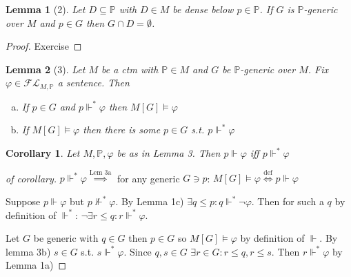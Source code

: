 \documentclass{scrartcl}
\theoremstyle{definition}
\theoremstyle{plain}
\newtheorem*{lemma*}{Lemma}
\newtheorem*{corollary*}{Corollary}
\theoremstyle{remark}
\begin{document}
	\begin{lemma*}[2]
		Let $D \subseteq \mathbb{P}$ with $D \in M$ be dense below
		$p \in \mathbb{P}$. If $G$ is $\mathbb{P}$-generic over $M$
		and $p \in G$ then $G \cap D = \emptyset$.
	\end{lemma*}

	\begin{proof}
		Exercise
	\end{proof}

	\begin{lemma*}[3]
		Let $M$ be a ctm with $\mathbb{P} \in M$ and $G$
		be $\mathbb{P}$-generic over $M$. Fix $\varphi \in \mathcal{FL}_{M, \mathbb{P}}$ a sentence. Then

		\begin{enumerate}[(a)]
			\item If $p \in G$ and $p \Vdash^* \varphi $ then
			$M[G] \vDash \varphi$

			\item If $M[G] \vDash \varphi$ then there is some
			$p \in G$ s.t. $p \Vdash^* \varphi$
		\end{enumerate}
	\end{lemma*}

	\begin{corollary*}
		Let $M, \mathbb{P}, \varphi $ be as in Lemma 3. Then 
		$p \Vdash \varphi $ iff $p \Vdash^* \varphi$
	\end{corollary*}

	\begin{proof}[of corollary]
		$p \Vdash^* \varphi \overset{\text{Lem 3a}}\implies$ for 
		any generic $G \ni p$: $M[G] \vDash \varphi \overset{\text{def}}\iff p \Vdash \varphi$

		Suppose $p \Vdash \varphi$ but $p \nVdash^* \varphi$.
		By Lemma 1c) $\exists q \leq p: q \Vdash^* \lnot \varphi$.
		Then for such a $q$ by definition of $\Vdash^*$: 
		$\lnot \exists r \leq q: r \Vdash^* \varphi$.

		Let $G$ be generic with $q \in G$ then $p \in G$ so $M[G] \vDash \varphi$
		by definition of $\Vdash$. By lemma 3b) $s \in G$ s.t.
		$s \Vdash^* \varphi$. Since $q, s \in G$ 
		$\exists r \in G: r \leq q, r \leq s$. 
		Then $r \Vdash^* \varphi$ by Lemma 1a)
	\end{proof}
\end{document}
